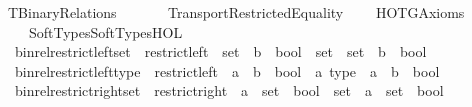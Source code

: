 %
\begin{isabellebody}%
%
%
\isadelimdocument
%
\endisadelimdocument
%
\isatagdocument
%
\isamarkuptrue%
%
\endisatagdocument
{\isafolddocument}%
%
\isadelimdocument
%
\endisadelimdocument
%
\isadelimtheory
%
\endisadelimtheory
%
\isatagtheory
{}\isamarkupfalse%
\ TBinary{\isacharunderscore}{\kern0pt}Relations\isanewline
\ \ \isanewline
\ \ \ \ Transport{\isachardot}{\kern0pt}Restricted{\isacharunderscore}{\kern0pt}Equality\isanewline
\ \ \ \ HOTG{\isachardot}{\kern0pt}Axioms\isanewline
\ \ \ \ Soft{\isacharunderscore}{\kern0pt}Types{\isachardot}{\kern0pt}Soft{\isacharunderscore}{\kern0pt}Types{\isacharunderscore}{\kern0pt}HOL\isanewline
{}%
\endisatagtheory
{\isafoldtheory}%
%
\isadelimtheory
\isanewline
%
\endisadelimtheory
\isanewline
{}\isamarkupfalse%
\isanewline
\ \ bin{\isacharunderscore}{\kern0pt}rel{\isacharunderscore}{\kern0pt}restrict{\isacharunderscore}{\kern0pt}left{\isacharunderscore}{\kern0pt}set\ {\isasymequiv}\ {\isachardoublequoteopen}restrict{\isacharunderscore}{\kern0pt}left\ {\isacharcolon}{\kern0pt}{\isacharcolon}{\kern0pt}\ {\isacharparenleft}{\kern0pt}set\ {\isasymRightarrow}\ {\isacharprime}{\kern0pt}b\ {\isasymRightarrow}\ bool{\isacharparenright}{\kern0pt}\ {\isasymRightarrow}\ set\ {\isasymRightarrow}\ set\ {\isasymRightarrow}\ {\isacharprime}{\kern0pt}b\ {\isasymRightarrow}\ bool{\isachardoublequoteclose}\isanewline
\ \ bin{\isacharunderscore}{\kern0pt}rel{\isacharunderscore}{\kern0pt}restrict{\isacharunderscore}{\kern0pt}left{\isacharunderscore}{\kern0pt}type\ {\isasymequiv}\ {\isachardoublequoteopen}restrict{\isacharunderscore}{\kern0pt}left\ {\isacharcolon}{\kern0pt}{\isacharcolon}{\kern0pt}\ {\isacharparenleft}{\kern0pt}{\isacharprime}{\kern0pt}a\ {\isasymRightarrow}\ {\isacharprime}{\kern0pt}b\ {\isasymRightarrow}\ bool{\isacharparenright}{\kern0pt}\ {\isasymRightarrow}\ {\isacharprime}{\kern0pt}a\ type\ {\isasymRightarrow}\ {\isacharprime}{\kern0pt}a\ {\isasymRightarrow}\ {\isacharprime}{\kern0pt}b\ {\isasymRightarrow}\ bool{\isachardoublequoteclose}\isanewline
\ \ bin{\isacharunderscore}{\kern0pt}rel{\isacharunderscore}{\kern0pt}restrict{\isacharunderscore}{\kern0pt}right{\isacharunderscore}{\kern0pt}set\ {\isasymequiv}\ {\isachardoublequoteopen}restrict{\isacharunderscore}{\kern0pt}right\ {\isacharcolon}{\kern0pt}{\isacharcolon}{\kern0pt}\ {\isacharparenleft}{\kern0pt}{\isacharprime}{\kern0pt}a\ {\isasymRightarrow}\ set\ {\isasymRightarrow}\ bool{\isacharparenright}{\kern0pt}\ {\isasymRightarrow}\ set\ {\isasymRightarrow}\ {\isacharprime}{\kern0pt}a\ {\isasymRightarrow}\ set\ {\isasymRightarrow}\ bool{\isachardoublequoteclose}\isanewline

\end{isabellebody}
